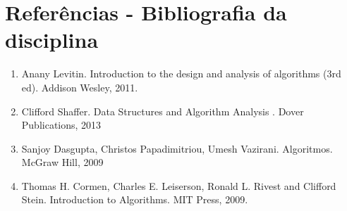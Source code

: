 \documentclass{article}
\begin{document}
\section{Referências - Bibliografia da disciplina}
\begin{enumerate}
    \item Anany Levitin. Introduction to the design and analysis of algorithms (3rd ed). Addison Wesley, 2011.
    \item Clifford Shaffer. Data Structures and Algorithm Analysis . Dover Publications, 2013
    \item Sanjoy Dasgupta, Christos Papadimitriou, Umesh Vazirani. Algoritmos. McGraw Hill, 2009
    \item Thomas H. Cormen, Charles E. Leiserson, Ronald L. Rivest and Clifford Stein. Introduction to Algorithms. MIT Press, 2009.
\end{enumerate}



\end{document}
